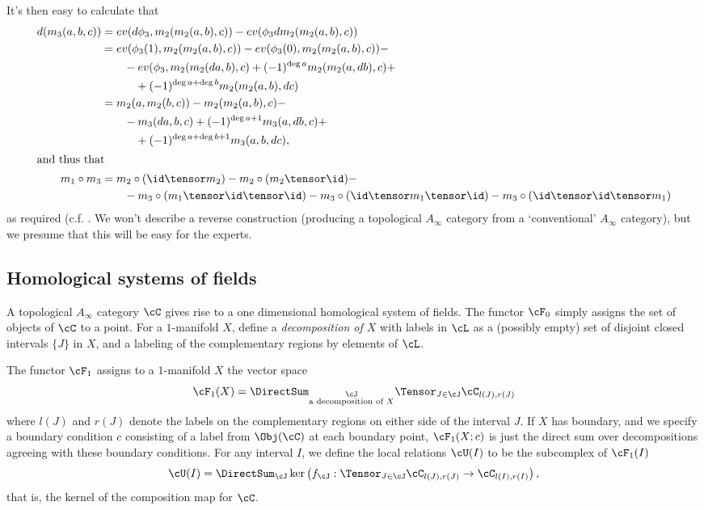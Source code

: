 It's then easy to calculate that
\begin{align*}
d(m_3(a,b,c)) & = ev(d \phi_3, m_2(m_2(a,b),c)) - ev(\phi_3 d m_2(m_2(a,b), c)) \\
 & = ev( \phi_3(1), m_2(m_2(a,b),c)) - ev(\phi_3(0), m_2 (m_2(a,b),c)) - \\ & \qquad - ev(\phi_3, m_2(m_2(da, b), c) + (-1)^{\deg a} m_2(m_2(a, db), c) + \\ & \qquad \quad + (-1)^{\deg a+\deg b} m_2(m_2(a, b), dc) \\
 & = m_2(a , m_2(b,c)) - m_2(m_2(a,b),c) - \\ & \qquad - m_3(da,b,c) + (-1)^{\deg a + 1} m_3(a,db,c) + \\ & \qquad \quad + (-1)^{\deg a + \deg b + 1} m_3(a,b,dc), \\
\intertext{and thus that}
m_1 \circ m_3 & =  m_2 \circ (\id \tensor m_2) - m_2 \circ (m_2 \tensor \id) - \\ & \qquad - m_3 \circ (m_1 \tensor \id \tensor \id) - m_3 \circ (\id \tensor m_1 \tensor \id) - m_3 \circ (\id \tensor \id \tensor m_1)
\end{align*}
as required (c.f. \cite[p. 6]{MR1854636}.
We won't describe a reverse construction (producing a topological $A_\infty$ category from a `conventional' $A_\infty$ category), but we presume that this will be easy for the experts.

\subsection{Homological systems of fields}

A topological $A_\infty$ category $\cC$ gives rise to a one dimensional homological system of fields. The functor $\cF_0$ simply assigns the set of objects of $\cC$ to a point. 
For a $1$-manifold $X$, define a \emph{decomposition of $X$} with labels in $\cL$ as a (possibly empty) set of disjoint closed intervals $\{J\}$ in $X$, and a labeling of the complementary regions by elements of $\cL$.

The functor $\cF_1$ assigns to a $1$-manifold $X$ the vector space
\begin{equation*}
\cF_1(X) = \DirectSum_{\substack{\cJ \\ \text{a decomposition of $X$}}} \Tensor_{J \in \cJ} \cC_{l(J),r(J)}
\end{equation*}
where $l(J)$ and $r(J)$ denote the labels on the complementary regions on either side of the interval $J$. If $X$ has boundary, and we specify a boundary condition $c$ consisting of a label from $\Obj(\cC)$ at each boundary point, $\cF_1(X;c)$ is just the direct sum over decompositions agreeing with these boundary conditions. For any interval $I$, we define the local relations $\cU(I)$ to be the subcomplex of $\cF_1(I)$
\begin{equation*}
\cU(I) = \DirectSum_{\cJ} \ker\left(f_\cJ : \Tensor_{J \in \cJ} \cC_{l(J),r(J)} \to \cC_{l(I),r(I)} \right),
\end{equation*}
that is, the kernel of the composition map for $\cC$.

